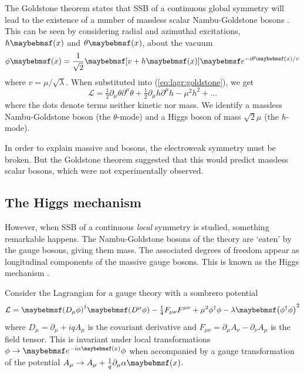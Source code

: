 The Goldstone theorem states that SSB of a continuous global symmetry will lead to 
the existence of a number of massless scalar Nambu-Goldstone bosons \cite{Goldstone:1962}.
This can be seen by considering radial and azimuthal excitations, $h\parenths{x}$ and 
$\theta\parenths{x}$, about the vacuum 
\begin{equation}
	\phi\parenths{x} = \frac{1}{\sqrt{2}} \sqbracs{v + h\parenths{x}} \eexp{-i\theta\parenths{x} / v}
\end{equation}
where $v = \mu/\sqrt{\lambda}$. When substituted into (\ref{eq:lagr:goldstone}), we get
\begin{equation}
	\mathcal{L} = \tfrac{1}{2}\partial_{\mu}\theta \partial^{\mu}\theta
	+ \tfrac{1}{2}\partial_{\mu}h \partial^{\mu}h
	- \mu^2 h^2
	+ \dots
\end{equation}
where the dots denote terms neither kinetic nor mass. 
We identify a massless Nambu-Goldstone boson (the $\theta$-mode) and a Higgs boson of 
mass $\sqrt{2}\mu$ (the $h$-mode).

In order to explain massive \PWpm and \PZ bosons, the electroweak symmetry must be broken.
But the Goldstone theorem suggested that this would predict massless scalar bosons, which
were not experimentally observed.



\subsection{The Higgs mechanism}
\label{sec:ewsb:higgs}

However, when SSB of a continuous \textit{local} symmetry is studied, something 
remarkable happens. The Nambu-Goldstone bosons of the theory are `eaten' by the gauge 
bosons, giving them mass. The associated degrees of freedom appear as longitudinal 
components of the massive gauge bosons. This is known as the Higgs mechanism 
\cite{Englert:1964,Higgs:1964a,Higgs:1964b,Guralnik:1964,Higgs:1966}.

Consider the Lagrangian for a  gauge theory with a sombrero potential
\begin{equation}
	\mathcal{L} 
	= \parenths{D_{\mu}\phi}^{\dagger} \parenths{D^{\mu}\phi}
	- \tfrac{1}{4} F_{\mu\nu} F^{\mu\nu}
	+ \mu^2 \phi^{\dagger} \phi - \lambda \parenths{\phi^{\dagger} \phi}^2
	\label{eq:lagr:abelHiggs}
\end{equation}
where $D_{\mu} = \partial_{\mu} + iqA_{\mu}$ is the covariant derivative and $F_{\mu\nu} 
= \partial_{\mu}A_{\nu} - \partial_{\nu}A_{\mu}$ is the field tensor. This is invariant 
under local  transformations $\phi \rightarrow \eexp{-i\alpha\parenths{x}} \phi$
when accompanied by a gauge transformation of the potential 
$A_{\mu} \rightarrow A_{\mu} + \tfrac{1}{q}\partial_{\mu} \alpha\parenths{x}$.

